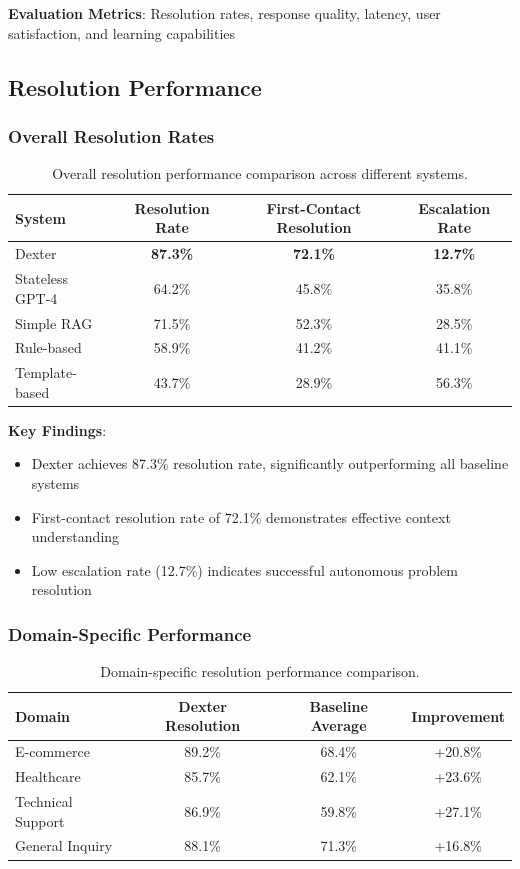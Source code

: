 \documentclass[11pt]{article}
\begin{document}
\textbf{Evaluation Metrics}: Resolution rates, response quality, latency, user satisfaction, and learning capabilities

\subsection{Resolution Performance}

\subsubsection{Overall Resolution Rates}

\begin{table}[H]
\centering
\begin{tabular}{@{}lccc@{}}
\toprule
System & Resolution Rate & First-Contact Resolution & Escalation Rate \\
\midrule
Dexter & \textbf{87.3\%} & \textbf{72.1\%} & \textbf{12.7\%} \\
Stateless GPT-4 & 64.2\% & 45.8\% & 35.8\% \\
Simple RAG & 71.5\% & 52.3\% & 28.5\% \\
Rule-based & 58.9\% & 41.2\% & 41.1\% \\
Template-based & 43.7\% & 28.9\% & 56.3\% \\
\bottomrule
\end{tabular}
\caption{Overall resolution performance comparison across different systems.}
\label{tab:resolution}
\end{table}

\textbf{Key Findings}:
\begin{itemize}
\item Dexter achieves 87.3\% resolution rate, significantly outperforming all baseline systems
\item First-contact resolution rate of 72.1\% demonstrates effective context understanding
\item Low escalation rate (12.7\%) indicates successful autonomous problem resolution
\end{itemize}

\subsubsection{Domain-Specific Performance}

\begin{table}[H]
\centering
\begin{tabular}{@{}lccc@{}}
\toprule
Domain & Dexter Resolution & Baseline Average & Improvement \\
\midrule
E-commerce & 89.2\% & 68.4\% & +20.8\% \\
Healthcare & 85.7\% & 62.1\% & +23.6\% \\
Technical Support & 86.9\% & 59.8\% & +27.1\% \\
General Inquiry & 88.1\% & 71.3\% & +16.8\% \\
\bottomrule
\end{tabular}
\caption{Domain-specific resolution performance comparison.}
\label{tab:domain}
\end{table}
\end{document}
